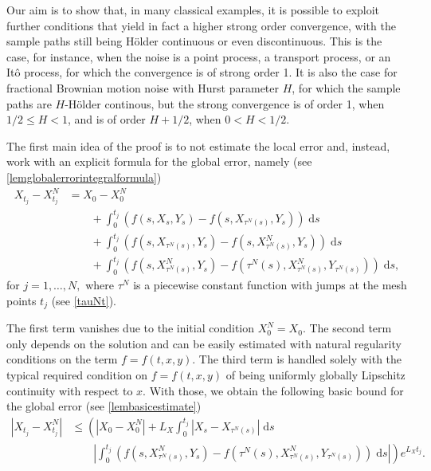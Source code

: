 \documentclass[reqno,12pt]{amsart}
\theoremstyle{plain}%
\theoremstyle{definition}
\begin{document}
Our aim is to show that, in many classical examples, it is possible to exploit further conditions that yield in fact a higher strong order convergence, with the sample paths still being H\"older continuous or even discontinuous. This is the case, for instance, when the noise is a point process, a transport process, or an It\^o process, for which the convergence is of strong order 1. It is also the case for fractional Brownian motion noise with Hurst parameter $H$, for which the sample paths are $H$-H\"older continous, but the strong convergence is of order 1, when $1/2 \leq H < 1$, and is of order $H + 1/2$, when $0 < H < 1/2$.

The first main idea of the proof is to not estimate the local error and, instead, work with an explicit formula for the global error, namely (see \cref{lemglobalerrorintegralformula})
\begin{equation}
    \label{lemglobalerrorintegralformulaintro}
    \begin{aligned}
        X_{t_j} - X_{t_j}^N & = X_0 - X_0^N \\
        & \qquad + \int_0^{t_j} \left( f(s, X_s, Y_s) - f(s, X_{\tau^N(s)}, Y_s) \right)\;\mathrm{d}s  \\ 
        & \qquad + \int_{0}^{t_j} \left( f(s, X_{\tau^N(s)}, Y_s) - f(s, X_{\tau^N(s)}^N, Y_s) \right)\;\mathrm{d}s \\
        & \qquad + \int_0^{t_j} \left( f(s, X_{\tau^N(s)}^N, Y_s) - f(\tau^N(s), X_{\tau^N(s)}^N, Y_{\tau^N(s)}) \right)\;\mathrm{d}s,
    \end{aligned}
\end{equation}
for $j = 1, \ldots, N,$ where $\tau^N$ is a piecewise constant function with jumps at the mesh points $t_j$ (see \cref{tauNt}).

The first term vanishes due to the initial condition $X_0^N = X_0$. The second term only depends on the solution and can be easily estimated with natural regularity conditions on the term $f=f(t, x, y)$. The third term is handled solely with the typical required condition on $f=f(t, x, y)$ of being uniformly globally Lipschitz continuity with respect to $x$. With those, we obtain the following basic bound for the global error (see \cref{lembasicestimate})
\begin{equation}
    \label{Etjbasicboundintro}
    \begin{aligned}
        |X_{t_j} - X_{t_j}^N| & \leq \left( |X_0 - X_0^N| + L_X \int_0^{t_j} |X_s - X_{\tau^N(s)}| \;\mathrm{d}s \right. \\
        & \qquad \left. \left|\int_0^{t_j} \left( f(s, X_{\tau^N(s)}^N, Y_s) - f(\tau^N(s), X_{\tau^N(s)}^N, Y_{\tau^N(s)}) \right)\;\mathrm{d}s\right|\right) e^{L_X t_j}.
    \end{aligned}
\end{equation}
\end{document}
